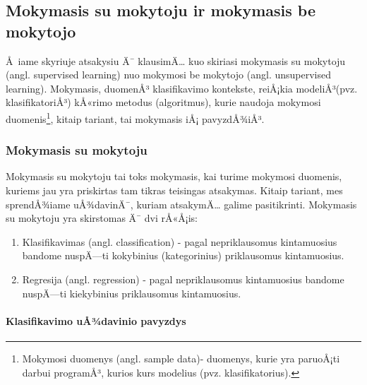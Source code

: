 \subsection{Mokymasis su mokytoju ir mokymasis be mokytojo}

Å iame skyriuje atsakysiu Ä¯ klausimÄ… kuo skiriasi mokymasis su
mokytoju (angl. supervised learning) nuo mokymosi be mokytojo (angl.
unsupervised learning). Mokymasis, duomenÅ³ klasifikavimo kontekste, reiÅ¡kia modeliÅ³(pvz. klasifikatoriÅ³) kÅ«rimo metodus (algoritmus), kurie naudoja
mokymosi duomenis\footnote{Mokymosi duomenys (angl. sample data)- duomenys,
kurie yra paruoÅ¡ti darbui programÅ³, kurios kurs modelius (pvz.
klasifikatorius).}, kitaip tariant, tai mokymasis iÅ¡ pavyzdÅ¾iÅ³.

\subsubsection{Mokymasis su mokytoju}

Mokymasis su mokytoju tai toks mokymasis, kai turime mokymosi duomenis, kuriems jau
yra priskirtas tam tikras teisingas atsakymas. Kitaip tariant, mes sprendÅ¾iame
uÅ¾davinÄ¯, kuriam atsakymÄ… galime pasitikrinti. Mokymasis su mokytoju yra
skirstomas Ä¯ dvi rÅ«Å¡is:
\begin{enumerate}
  \item Klasifikavimas (angl. classification) - pagal nepriklausomus
  kintamuosius bandome nuspÄ—ti kokybinius (kategorinius) priklausomus kintamuosius. 
  \item Regresija (angl. regression) - pagal nepriklausomus kintamuosius bandome
  nuspÄ—ti kiekybinius priklausomus kintamuosius.
\end{enumerate} 



\paragraph{Klasifikavimo uÅ¾davinio pavyzdys}

